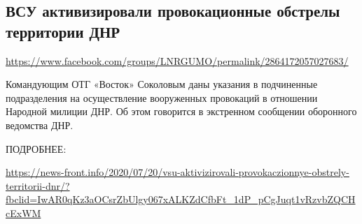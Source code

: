  
 

\subsection{ВСУ активизировали провокационные обстрелы территории ДНР}
\label{sec:21_07_2020.fb.lnr.13}
\url{https://www.facebook.com/groups/LNRGUMO/permalink/2864172057027683/}
  
Командующим ОТГ «Восток» Соколовым даны указания в подчиненные подразделения на
осуществление вооруженных провокаций в отношении Народной милиции ДНР. Об этом
говорится в экстренном сообщении оборонного ведомства ДНР.

ПОДРОБНЕЕ: 

\url{https://news-front.info/2020/07/20/vsu-aktivizirovali-provokaczionnye-obstrely-territorii-dnr/?fbclid=IwAR0qKz3aOCsrZbUlgy067xALKZdCfbFt_1dP_pCgJuqt1vRzvbZQCHcExWM}
  
